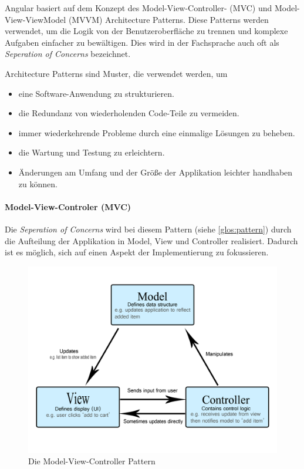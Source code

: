 Angular basiert auf dem Konzept des Model-View-Controller- (MVC) und Model-View-ViewModel (MVVM) Architecture Patterns. Diese Patterns werden verwendet, um die Logik von der Benutzeroberfläche zu trennen und komplexe Aufgaben einfacher zu bewältigen. Dies wird in der Fachsprache auch oft als \emph{Seperation of Concerns} bezeichnet.
\cite{AngularArchitecturePattern} 

Architecture Patterns sind Muster, die verwendet werden, um
\begin{itemize}
  \item eine Software-Anwendung zu strukturieren.
  \item die Redundanz von wiederholenden Code-Teile zu vermeiden.
  \item immer wiederkehrende Probleme durch eine einmalige Lösungen zu beheben.
  \item die Wartung und Testung zu erleichtern.
  \item Änderungen am Umfang und der Größe der Applikation leichter handhaben zu können. \cite{MVCmdn, MVVM, MVC}
\end{itemize} 

\paragraph{Model-View-Controler (MVC)}
Die \emph{Seperation of Concerns} wird bei diesem Pattern (siehe \ref{glos:pattern}) durch die Aufteilung der Applikation in Model, View und Controller realisiert. Dadurch ist es möglich, sich auf einen Aspekt der Implementierung zu fokussieren. 

\begin{figure} [h t]
  \centering
  \includegraphics[scale=0.5]{pics/mvc.png}
  \caption{Die Model-View-Controller Pattern \cite{MVCmdn}}
  \label{fig:tech:front:mvc-architecture}
\end{figure}

